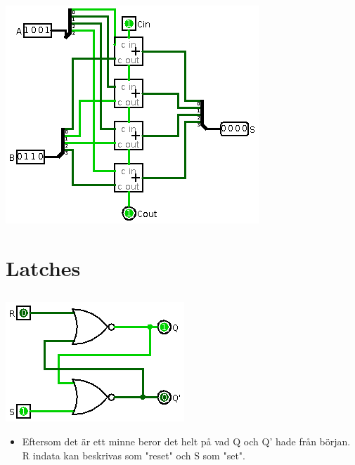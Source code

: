 \documentclass[11pt]{article}
\begin{document}
\includegraphics[width=.9\linewidth]{./assignment3-2.png}


\section{Latches}
\label{sec:orgheadline12}

\subsection{}
\label{sec:orgheadline10}
\includegraphics[width=.9\linewidth]{./assignment4-1.png}

\begin{itemize}
\item Eftersom det är ett minne beror det helt på vad Q och Q' hade från början. R indata kan beskrivas som "reset" och S som "set".
\end{itemize}
\end{document}
